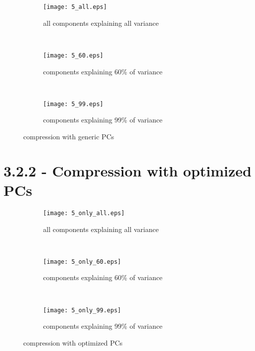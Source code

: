\documentclass[a4paper,11pt]{article}
\theoremstyle{definition}
\theoremstyle{plain}
\theoremstyle{remark}
\begin{document}
\begin{figure}[h!]
\begin{subfigure}[b]{0.3\textwidth}
\centering
\texttt{[image: 5\_all.eps]}
  \caption{all components explaining all variance}
  
\end{subfigure}%
~ %
\begin{subfigure}[b]{0.3\textwidth}
  \centering
  \texttt{[image: 5\_60.eps]}
  \caption{components explaining 60\% of variance}
 
\end{subfigure}
~ %
\begin{subfigure}[b]{0.3\textwidth}
  \centering
  \texttt{[image: 5\_99.eps]}
  \caption{components explaining 99\% of variance}
  
\end{subfigure}
        \caption{compression with generic PCs}
\label{fig:gen}
\end{figure}


\section*{3.2.2 - Compression with optimized PCs}
\begin{figure}[h!]
\begin{subfigure}[b]{0.3\textwidth}
\centering
\texttt{[image: 5\_only\_all.eps]}
 \caption{all components explaining all variance}
  
\end{subfigure}%
~ %
\begin{subfigure}[b]{0.3\textwidth}
\centering
\texttt{[image: 5\_only\_60.eps]}
\caption{components explaining 60\% of variance}
 
\end{subfigure}
~ %
\begin{subfigure}[b]{0.3\textwidth}
\centering
\texttt{[image: 5\_only\_99.eps]}
\caption{components explaining 99\% of variance}
  
\end{subfigure}
\caption{compression with optimized PCs}
\label{fig:opt}
\end{figure}
\end{document}
